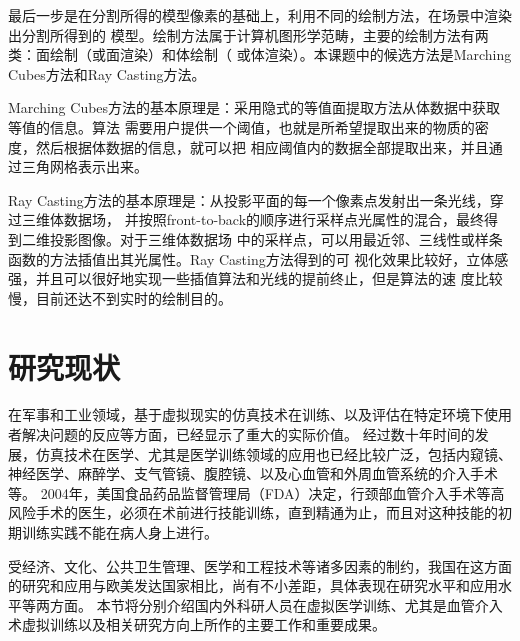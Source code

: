 最后一步是在分割所得的模型像素的基础上，利用不同的绘制方法，在场景中渲染出分割所得到的
模型。绘制方法属于计算机图形学范畴，主要的绘制方法有两类：面绘制（或面渲染）和体绘制（
或体渲染）。本课题中的候选方法是Marching Cubes方法和Ray Casting方法。

Marching Cubes方法的基本原理是：采用隐式的等值面提取方法从体数据中获取等值的信息。算法
需要用户提供一个阈值，也就是所希望提取出来的物质的密度，然后根据体数据的信息，就可以把
相应阈值内的数据全部提取出来，并且通过三角网格表示出来。

Ray Casting方法的基本原理是：从投影平面的每一个像素点发射出一条光线，穿过三维体数据场，
并按照front-to-back的顺序进行采样点光属性的混合，最终得到二维投影图像。对于三维体数据场
中的采样点，可以用最近邻、三线性或样条函数的方法插值出其光属性。Ray Casting方法得到的可
视化效果比较好，立体感强，并且可以很好地实现一些插值算法和光线的提前终止，但是算法的速
度比较慢，目前还达不到实时的绘制目的。

\section{研究现状}
\label{sec1-4}


在军事和工业领域，基于虚拟现实的仿真技术在训练、以及评估在特定环境下使用者解决问题的反应等方面，已经显示了重大的实际价值\cite{Goodwin1978Simulator}\cite{Rolfe1986Simulators}\cite{Ressler1999Simulators}\cite{Wachtel1985Simulators}\cite{Liu2013Military}。
经过数十年时间的发展\cite{Dawson1998}，仿真技术在医学、尤其是医学训练领域的应用也已经比较广泛，包括内窥镜\cite{Vining1995Endoscopy}\cite{Preminger1996Endoscopy}、神经医学\cite{Kockro2000Neurosurgery}\cite{Cotin2005EVE}\cite{Ma2007NeuroCath}、麻醉学\cite{Gaba1988Anesthesiology}、支气管镜\cite{Vining1996Bronchoscopy}、腹腔镜\cite{Hon1994Laparoscopy}\cite{Derossis1998Laparoscopy}、以及心血管和外周血管系统的介入手术\cite{Chui1998ICard}\cite{Cotin2000ICTS}\cite{Tan2012NUDT}等。
2004年，美国食品药品监督管理局（FDA）决定，行颈部血管介入手术等高风险手术的医生，必须在术前进行技能训练，直到精通为止，而且对这种技能的初期训练实践不能在病人身上进行\cite{Dawson2006Medicine}。

受经济、文化、公共卫生管理、医学和工程技术等诸多因素的制约，我国在这方面的研究和应用与欧美发达国家相比，尚有不小差距，具体表现在研究水平和应用水平等两方面。
本节将分别介绍国内外科研人员在虚拟医学训练、尤其是血管介入术虚拟训练以及相关研究方向上所作的主要工作和重要成果。

